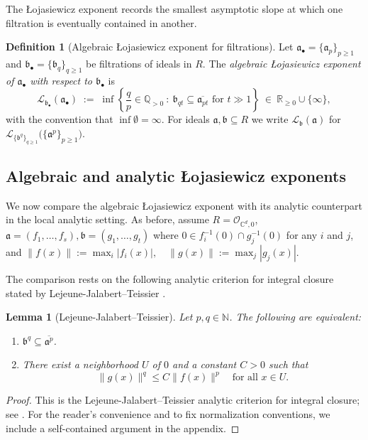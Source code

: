 \documentclass[12pt]{amsart}
\newcommand{\QQ}{\mathbb{Q}}
\newcommand{\RR}{\mathbb{R}}
\newcommand{\CC}{\mathbb{C}}
\renewcommand{\a}{\mathfrak{a}}
\renewcommand{\b}{\mathfrak{b}}
\newcommand{\Loj}{\mathcal{L}} %
\newcommand{\abul}{{\a_\bullet}}
\newcommand{\bbul}{{\b_\bullet}}
\theoremstyle{plain}
\newtheorem{lemma}[theorem]{Lemma}
\theoremstyle{definition}
\newtheorem{definition}[theorem]{Definition}
\numberwithin{equation}{section}
\begin{document}
The \L{}ojasiewicz exponent records the smallest asymptotic slope at which one
filtration is eventually contained in another.


\begin{definition}[Algebraic \L ojasiewicz exponent for filtrations]
	\label{def:L-families}
	Let $\abul=\{\a_p\}_{p\ge1}$ and $\bbul=\{\b_q\}_{q\ge1}$ be filtrations
	of ideals in $R$.
	The \emph{algebraic \L ojasiewicz exponent of $\abul$ with respect to $\bbul$} is
	\[
	\Loj_{\bbul}(\abul)
	\;:=\;
	\inf\left\{\frac{q}{p}\in\QQ_{>0}\ :\ \b_{qt}\subseteq \overline{\a_{pt}} \text{ for } t \gg 1\right\}
	\ \in\ \RR_{\ge0} \cup \{\infty\},
	\]
	with the convention that $\inf \emptyset = \infty$. For ideals $\a,\b\subseteq R$ we write $\Loj_{\b}(\a)$ for $\Loj_{\{\b^q\}_{q \ge 1}}\bigl(\{\a^p\}_{p\ge1}\bigr)$.
\end{definition}


\subsection{Algebraic and analytic \L ojasiewicz exponents}
We now compare the algebraic \L{}ojasiewicz exponent with its analytic
counterpart in the local analytic setting.
As before, assume $R=\mathcal O_{\CC^d,0}$, $\a=(f_1,\dots,f_s),  \b=(g_1,\dots,g_t)$
where $0 \in f_i^{-1}(0) \cap g_j^{-1}(0)$ for any $i$ and $j$, and
$\|f(x)\|:=\max_i|f_i(x)|,\quad \|g(x)\|:=\max_j|g_j(x)|.$

The comparison rests on the following analytic criterion for integral closure stated by Lejeune-Jalabert--Teissier \cite{LT}.

\begin{lemma}[Lejeune-Jalabert--Teissier]\label{lem:analytic-IC}
	Let $p,q\in\mathbb N$. The following are equivalent:
	\begin{enumerate}
		\item[(1)] $\b^q\subseteq \overline{\a^p}$.
		\item[(2)] There exist a neighborhood $U$ of $0$ and a constant $C>0$ such that
		\[
		\|g(x)\|^q\le C\|f(x)\|^p
		\quad\text{for all }x\in U.
		\]
	\end{enumerate}
\end{lemma}

\begin{proof}
	This is the Lejeune-Jalabert--Teissier analytic criterion for integral closure; see \cite[Th\'eor\`eme~7.2]{LT}.
	For the reader's convenience and to fix normalization conventions, we include a self-contained argument in the appendix.
\end{proof}
\end{document}
